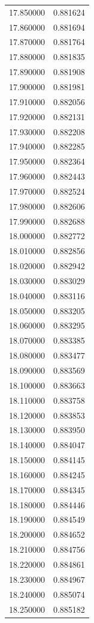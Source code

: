 \begin{tabular}{rr}
17.850000 & 0.881624 \\
17.860000 & 0.881694 \\
17.870000 & 0.881764 \\
17.880000 & 0.881835 \\
17.890000 & 0.881908 \\
17.900000 & 0.881981 \\
17.910000 & 0.882056 \\
17.920000 & 0.882131 \\
17.930000 & 0.882208 \\
17.940000 & 0.882285 \\
17.950000 & 0.882364 \\
17.960000 & 0.882443 \\
17.970000 & 0.882524 \\
17.980000 & 0.882606 \\
17.990000 & 0.882688 \\
18.000000 & 0.882772 \\
18.010000 & 0.882856 \\
18.020000 & 0.882942 \\
18.030000 & 0.883029 \\
18.040000 & 0.883116 \\
18.050000 & 0.883205 \\
18.060000 & 0.883295 \\
18.070000 & 0.883385 \\
18.080000 & 0.883477 \\
18.090000 & 0.883569 \\
18.100000 & 0.883663 \\
18.110000 & 0.883758 \\
18.120000 & 0.883853 \\
18.130000 & 0.883950 \\
18.140000 & 0.884047 \\
18.150000 & 0.884145 \\
18.160000 & 0.884245 \\
18.170000 & 0.884345 \\
18.180000 & 0.884446 \\
18.190000 & 0.884549 \\
18.200000 & 0.884652 \\
18.210000 & 0.884756 \\
18.220000 & 0.884861 \\
18.230000 & 0.884967 \\
18.240000 & 0.885074 \\
18.250000 & 0.885182 \\

\end{tabular}
